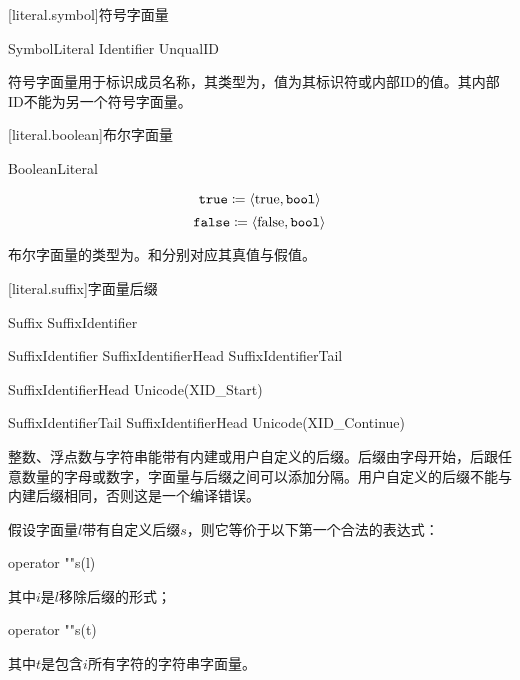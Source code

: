 \exitexample

[literal.symbol]{符号字面量}

\begin{bnf}{SymbolLiteral}
     Identifier \br
     UnqualID \terminal{)}
\end{bnf}

\pnum
符号字面量用于标识成员名称，其类型为，值为其标识符或内部ID的值。其内部ID不能为另一个符号字面量。

[literal.boolean]{布尔字面量}

\begin{bnf}{BooleanLiteral}
     \br
\end{bnf}

$$ \texttt{true} \coloneqq \langle \mathrm{true}, \texttt{bool} \rangle $$
$$ \texttt{false} \coloneqq \langle \mathrm{false}, \texttt{bool} \rangle $$

\pnum
布尔字面量的类型为。和分别对应其真值与假值。

[literal.suffix]{字面量后缀}

\begin{bnf}{Suffix}
    \terminal{_}\bnfq SuffixIdentifier
\end{bnf}

\begin{bnf}{SuffixIdentifier}
    SuffixIdentifierHead SuffixIdentifierTail\bnfs
\end{bnf}

\begin{bnf}{SuffixIdentifierHead}
    Unicode(XID_Start)
\end{bnf}

\begin{bnf}{SuffixIdentifierTail}
    SuffixIdentifierHead \br
    Unicode(XID_Continue)
\end{bnf}

\pnum
整数、浮点数与字符串能带有内建或用户自定义的后缀。后缀由字母开始，后跟任意数量的字母或数字，字面量与后缀之间可以添加\tcode{_}分隔。用户自定义的后缀不能与内建后缀相同，否则这是一个编译错误。

\pnum
假设字面量$l$带有自定义后缀$s$，则它等价于以下第一个合法的表达式：
\begin{codeblock}
    operator ""s(l)
\end{codeblock}
其中$i$是$l$移除后缀的形式；
\begin{codeblock}
    operator ""s(t)
\end{codeblock}
其中$t$是包含$i$所有字符的字符串字面量。
